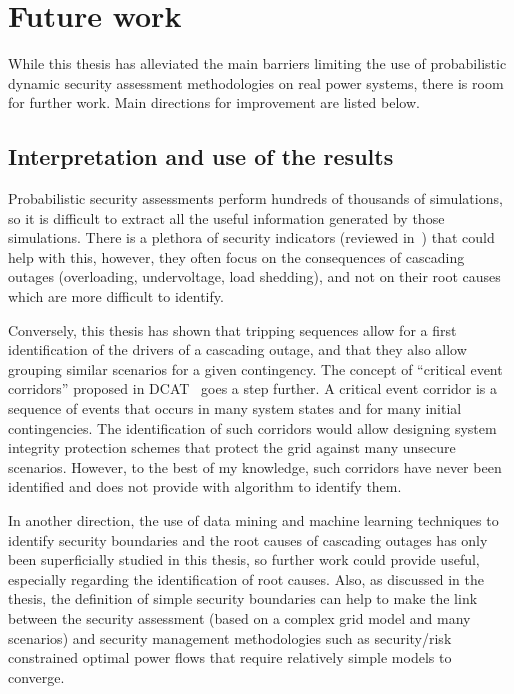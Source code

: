 

\section{Future work}

While this thesis has alleviated the main barriers limiting the use of probabilistic dynamic security assessment methodologies on real power systems, there is room for further work. Main directions for improvement are listed below.

\subsection*{Interpretation and use of the results}

Probabilistic security assessments perform hundreds of thousands of simulations, so it is difficult to extract all the useful information generated by those simulations. There is a plethora of security indicators (reviewed in~\cite{cypressD11}) that could help with this, however, they often focus on the consequences of cascading outages (overloading, undervoltage, load shedding), and not on their root causes which are more difficult to identify.

Conversely, this thesis has shown that tripping sequences allow for a first identification of the drivers of a cascading outage, and that they also allow grouping similar scenarios for a given contingency. The concept of ``critical event corridors'' proposed in DCAT~\cite{DCATphase1} goes a step further. A critical event corridor is a sequence of events that occurs in many system states and for many initial contingencies. The identification of such corridors would allow designing system integrity protection schemes that protect the grid against many unsecure scenarios. However, to the best of my knowledge, such corridors have never been identified and \cite{DCATphase1} does not provide with algorithm to identify them.

In another direction, the use of data mining and machine learning techniques to identify security boundaries and the root causes of cascading outages has only been superficially studied in this thesis, so further work could provide useful, especially regarding the identification of root causes. Also, as discussed in the thesis, the definition of simple security boundaries can help to make the link between the security assessment (based on a complex grid model and many scenarios) and security management methodologies such as security/risk constrained optimal power flows that require relatively simple models to converge.


